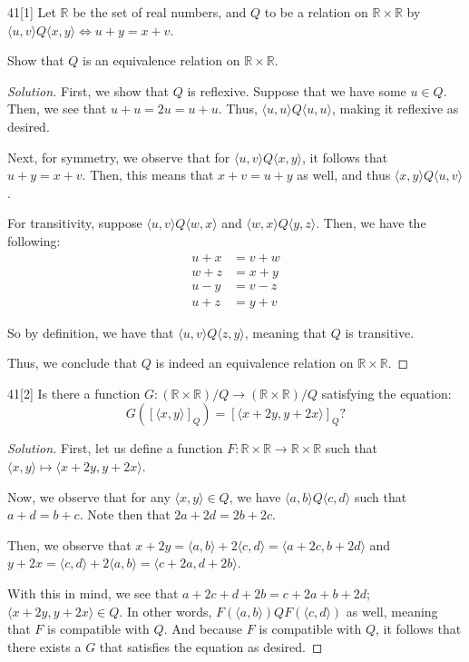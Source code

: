 \documentclass{article}
\newenvironment{solution}{\begin{proof}[Solution]}{\end{proof}}
\newcommand{\RR}{\mathbb{R}}
\newcommand{\pr}[1]{\left( {#1} \right)}
\newcommand{\br}[1]{\left[ {#1} \right]}
\newcommand{\ang}[1]{\langle {#1} \rangle}
\begin{document}
	\begin{hw}{41}[1]
		Let $\RR$ be the set of real numbers, and $Q$ to be a relation on $\RR \times \RR$ by $\ang{u,v} Q \ang{x,y} \iff u+y = x + v$.
		
		Show that $Q$ is an equivalence relation on $\RR \times \RR$.
	\end{hw}
	\begin{solution}
		First, we show that $Q$ is reflexive. Suppose that we have some $u \in Q$. Then, we see that $u+u = 2u = u+u$. Thus, $\ang{u,u} Q \ang{u,u}$, making it reflexive as desired.
		
		Next, for symmetry, we observe that for $\ang{u,v}Q\ang{x,y}$, it follows that $u+y = x+v$. Then, this means that $x+v = u+y$ as well, and thus $\ang{x,y}Q\ang{u,v}$.
		
		For transitivity, suppose $\ang{u,v}Q\ang{w,x}$ and $\ang{w,x}Q\ang{y,z}$. Then, we have the following:
		\begin{align*}
			u + x  &= v + w \\
			w + z &= x + y \\
			u - y &= v - z \\
			u + z &= y + v
		\end{align*} 
	
		So by definition, we have that $\ang{u,v} Q \ang{z,y}$, meaning that $Q$ is transitive.
		
		Thus, we conclude that $Q$ is indeed an equivalence relation on $\RR \times \RR$.
	\end{solution}

	\begin{hw}{41}[2]
		Is there a function $G: (\RR \times \RR) / Q \rightarrow \pr{\RR \times \RR} / Q$ satisfying the equation:
		\begin{equation*}
			G\pr{\br{\ang{x,y}}_{Q}} = \br{\ang{x+2y, y+2x}}_{Q}?
		\end{equation*}
	\end{hw}
	\begin{solution}
		First, let us define a function $F : \RR \times \RR \rightarrow \RR \times \RR$ such that $\ang{x,y} \mapsto \ang{x+2y, y+2x}$.
		
		Now, we observe that for any $\ang{x,y} \in Q$, we have $\ang{a,b}Q\ang{c,d}$ such that $a+d = b + c$. Note then that $2a+2d = 2b+2c$.
		
		Then, we observe that $x+2y = \ang{a,b} + 2\ang{c,d} = \ang{a+2c, b+2d}$ and $y + 2x = \ang{c,d} + 2\ang{a,b} = \ang{c+2a, d+2b}$.
		
		With this in mind, we see that $a + 2c + d + 2b = c + 2a + b + 2d$; $\ang{x+2y, y+2x} \in Q$. In other words, $F\pr{\ang{a,b}} Q F\pr{\ang{c,d}}$ as well, meaning that $F$ is compatible with $Q$. And because $F$ is compatible with $Q$, it follows that there exists a $G$ that satisfies the equation as desired. 
	\end{solution}
\end{document}
